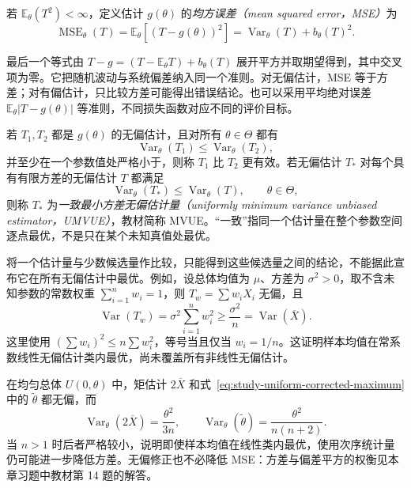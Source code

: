 \begin{definition}[均方误差]
\label{def:study-estimator-mse}
若 $\mathbb E_\theta(T^2)<\infty$，定义估计 $g(\theta)$ 的\emph{均方误差（mean squared error，MSE）}为
\begin{equation}
  \operatorname{MSE}_\theta(T)
     =\mathbb E_\theta[(T-g(\theta))^2]
     =\operatorname{Var}_\theta(T)+b_\theta(T)^2.
  \label{eq:study-mse-decomposition}
\end{equation}
\end{definition}

最后一个等式由 $T-g=(T-\mathbb E_\theta T)+b_\theta(T)$ 展开平方并取期望得到，其中交叉项为零。它把随机波动与系统偏差纳入同一个准则。对无偏估计，MSE 等于方差；对有偏估计，只比较方差可能得出错误结论。也可以采用平均绝对误差 $\mathbb E_\theta|T-g(\theta)|$ 等准则，不同损失函数对应不同的评价目标。

\begin{definition}[有效性与最小方差无偏估计]
\label{def:study-mvue}
若 $T_1,T_2$ 都是 $g(\theta)$ 的无偏估计，且对所有 $\theta\in\Theta$ 都有
\[
  \operatorname{Var}_\theta(T_1)\le\operatorname{Var}_\theta(T_2),
\]
并至少在一个参数值处严格小于，则称 $T_1$ 比 $T_2$ 更有效。若无偏估计 $T_*$ 对每个具有有限方差的无偏估计 $T$ 都满足
\begin{equation}
  \operatorname{Var}_\theta(T_*)\le\operatorname{Var}_\theta(T),
  \qquad\theta\in\Theta,
  \label{eq:study-umvue}
\end{equation}
则称 $T_*$ 为\emph{一致最小方差无偏估计量（uniformly minimum variance unbiased estimator，UMVUE）}，教材简称 MVUE。“一致”指同一个估计量在整个参数空间逐点最优，不是只在某个未知真值处最优。
\end{definition}

将一个估计量与少数候选量作比较，只能得到这些候选量之间的结论，不能据此宣布它在所有无偏估计中最优。例如，设总体均值为 $\mu$、方差为 $\sigma^2>0$，取不含未知参数的常数权重 $\sum_{i=1}^nw_i=1$，则 $T_w=\sum w_iX_i$ 无偏，且
\[
  \operatorname{Var}(T_w)=\sigma^2\sum_{i=1}^nw_i^2
    \ge\frac{\sigma^2}{n}
    =\operatorname{Var}(\overline X).
\]
这里使用 $(\sum w_i)^2\le n\sum w_i^2$，等号当且仅当 $w_i=1/n$。这证明样本均值在常系数线性无偏估计类内最优，尚未覆盖所有非线性无偏估计。

在均匀总体 $U(0,\theta)$ 中，矩估计 $2\overline X$ 和式~\eqref{eq:study-uniform-corrected-maximum} 中的 $\widetilde\theta$ 都无偏，而
\[
  \operatorname{Var}_\theta(2\overline X)=\frac{\theta^2}{3n},
  \qquad
  \operatorname{Var}_\theta(\widetilde\theta)
       =\frac{\theta^2}{n(n+2)}.
\]
当 $n>1$ 时后者严格较小，说明即使样本均值在线性类内最优，使用次序统计量仍可能进一步降低方差。无偏修正也不必降低 MSE：方差与偏差平方的权衡见本章习题中教材第 14 题的解答。

